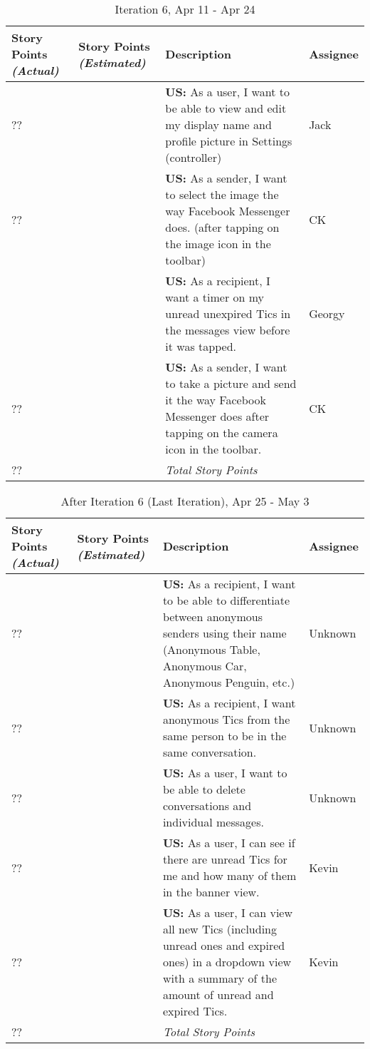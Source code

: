 \clearpage
\begin{table}[H]
	\centering
	\caption{Iteration 6, Apr 11 - Apr 24}
	 \renewcommand{\arraystretch}{1.2}
	\begin{tabular}{>{\centering\arraybackslash}m{2.3cm} >{\centering\arraybackslash}m{2.3cm} | m{7cm} m{1.6cm} }
		\toprule
		Story Points \textit{(Actual)} & Story Points \textit{(Estimated)} & Description & Assignee\\
		\midrule
		?? 	& 5 	& \textbf{US:} As a user, I want to be able to view and edit my display name and profile picture in Settings (controller) & Jack\\
		?? 	& 5 	& \textbf{US:} As a sender, I want to select the image the way Facebook Messenger does. (after tapping on the image icon in the toolbar) & CK\\
		5 	& 3 	& \textbf{US:} As a recipient, I want a timer on my unread unexpired Tics in the messages view before it was tapped. & Georgy\\
 		?? 	& 5 	& \textbf{US:} As a sender, I want to take a picture and send it the way Facebook Messenger does after tapping on the camera icon in the toolbar. & CK\\
 		\midrule
		?? 	& 18 	& \textit{Total Story Points} &\\
		\bottomrule
	\end{tabular}
\end{table}

\clearpage
\begin{table}[H]
	\centering
	\caption{After Iteration 6 (Last Iteration), Apr 25 - May 3}
	 \renewcommand{\arraystretch}{1.2}
	\rowcolors{2}{white}{gray!20}
	\begin{tabular}{>{\centering\arraybackslash}m{2.3cm} >{\centering\arraybackslash}m{2.3cm} | m{7cm} m{1.6cm} }
		\toprule
		Story Points \textit{(Actual)} & Story Points \textit{(Estimated)} & Description & Assignee\\
		\midrule
 		?? 	& 3 	& \textbf{US:} As a recipient, I want to be able to differentiate between anonymous senders using their name (Anonymous Table, Anonymous Car, Anonymous Penguin, etc.) & Unknown\\
 		?? 	& 3 	& \textbf{US:} As a recipient, I want anonymous Tics from the same person to be in the same conversation. & Unknown\\
		?? 	& 1 	& \textbf{US:} As a user, I want to be able to delete conversations and individual messages. & Unknown\\
		??	& 12 & \textbf{US:} As a user, I can see if there are unread Tics for me and how many of them in the banner view. & Kevin\\
		??	& 12 & \textbf{US:} As a user, I can view all new Tics (including unread ones and expired ones) in a dropdown view with a summary of the amount of unread and expired Tics. & Kevin\\
 		\midrule
		?? 	& 7 	& \textit{Total Story Points} &\\
		\bottomrule
	\end{tabular}
\end{table}

